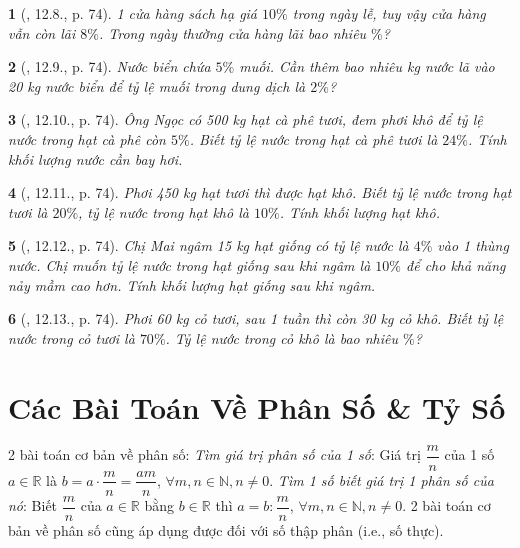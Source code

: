 \documentclass{article}
\newtheorem{baitoan}{}
\begin{document}
\begin{baitoan}[\cite{TLCT_THCS_Toan_6_so_hoc}, 12.8., p. 74]
	1 cửa hàng sách hạ giá $10\%$ trong ngày lễ, tuy vậy cửa hàng vẫn còn lãi $8\%$. Trong ngày thường cửa hàng lãi bao nhiêu $\%$?
\end{baitoan}

\begin{baitoan}[\cite{TLCT_THCS_Toan_6_so_hoc}, 12.9., p. 74]
	Nước biển chứa $5\%$ muối. Cần thêm bao nhiêu {\rm kg} nước lã vào {\rm20 kg} nước biển để tỷ lệ muối trong dung dịch là $2\%$?
\end{baitoan}

\begin{baitoan}[\cite{TLCT_THCS_Toan_6_so_hoc}, 12.10., p. 74]
	Ông Ngọc có {\rm500 kg} hạt cà phê tươi, đem phơi khô để tỷ lệ nước trong hạt cà phê còn $5\%$. Biết tỷ lệ nước trong hạt cà phê tươi là $24\%$. Tính khối lượng nước cần bay hơi.
\end{baitoan}

\begin{baitoan}[\cite{TLCT_THCS_Toan_6_so_hoc}, 12.11., p. 74]
	Phơi {\rm450 kg} hạt tươi thì được hạt khô. Biết tỷ lệ nước trong hạt tươi là $20\%$, tỷ lệ nước trong hạt khô là $10\%$. Tính khối lượng hạt khô.
\end{baitoan}

\begin{baitoan}[\cite{TLCT_THCS_Toan_6_so_hoc}, 12.12., p. 74]
	Chị Mai ngâm {\rm15 kg} hạt giống có tỷ lệ nước là $4\%$ vào 1 thùng nước. Chị muốn tỷ lệ nước trong hạt giống sau khi ngâm là $10\%$ để cho khả năng nảy mầm cao hơn. Tính khối lượng hạt giống sau khi ngâm.
\end{baitoan}

\begin{baitoan}[\cite{TLCT_THCS_Toan_6_so_hoc}, 12.13., p. 74]
	Phơi {\rm60 kg} cỏ tươi, sau 1 tuần thì còn {\rm30 kg} cỏ khô. Biết tỷ lệ nước trong cỏ tươi là $70\%$. Tỷ lệ nước trong cỏ khô là bao nhiêu $\%$?
\end{baitoan}


\section{Các Bài Toán Về Phân Số \& Tỷ Số}
2 bài toán cơ bản về phân số:  \textit{Tìm giá trị phân số của 1 số}: Giá trị $\dfrac{m}{n}$ của 1 số $a\in\mathbb{R}$ là $b = a\cdot\dfrac{m}{n} = \dfrac{am}{n}$, $\forall m,n\in\mathbb{N},n\ne0$.  \textit{Tìm 1 số biết giá trị 1 phân số của nó}: Biết $\dfrac{m}{n}$ của $a\in\mathbb{R}$ bằng $b\in\mathbb{R}$ thì $a = b:\dfrac{m}{n}$, $\forall m,n\in\mathbb{N},n\ne0$.  2 bài toán cơ bản về phân số cũng áp dụng được đối với số thập phân (i.e., số thực).\\
\end{document}

